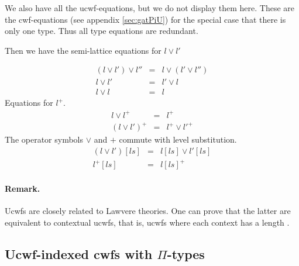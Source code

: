 \documentclass[11pt,a4paper]{article}
\theoremstyle{definition}
\begin{document}
We also have all the ucwf-equations, but we do not display them here. These are the cwf-equations (see appendix   \ref{sec:gatPiU}) for the special case that there is only one type. Thus all type equations are redundant.

Then we have the semi-lattice equations for $l \vee l'$

\begin{eqnarray*}
(l \vee l') \vee l'' &=& l \vee (l' \vee l'')\\
l \vee l' &=& l'\vee l\\
l \vee l &=& l
\end{eqnarray*}
Equations for $l^+$.
\begin{eqnarray*}
l \vee l^+ &=& l^+\\
(l\vee l')^+ &=& l^+\vee l'^+
\end{eqnarray*}
The operator symbols $\vee$ and $+$ commute with level substitution.
\begin{eqnarray*}
(l \vee l')[ls] &=& l[ls] \vee l' [ls]\\
 l^+[ls] &=&  l[ls]^+
\end{eqnarray*}
\paragraph{Remark.} Ucwfs are closely related to Lawvere theories. One can prove that the latter are equivalent to contextual ucwfs, that is, ucwfs where each context has a length \cite{CCD:lambek}.

\subsection{Ucwf-indexed cwfs  with $\Pi$-types}
\end{document}
